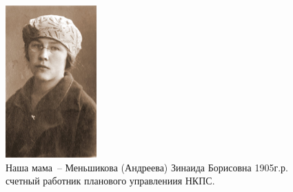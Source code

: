 \documentclass[utf8x, 10pt]{G7-32} %
\begin{document}
\makeatletter
\renewcommand{\@oddfoot}{\hfill\thepage}
\renewcommand{\@evenfoot}{\thepage\hfill}

\makeatother

\frontmatter %


\thispagestyle{empty} 

\begin{figure}[h!]
    \begin{minipage}[h!]{50mm}
         \begin{center}
         \vspace{-15pt}
         \includegraphics[width=35mm]{inc/Menshekovy/11.jpg} 
         \end{center}
         \caption{Наша мама~-- Меньшикова (Андреева) Зинаида Борисовна 1905г.р. счетный работник планового управлениия НКПС.}
    \end{minipage}
    \hfill
   \begin{minipage}[h]{70mm}

\end{minipage}
\end{figure}
\end{document}
